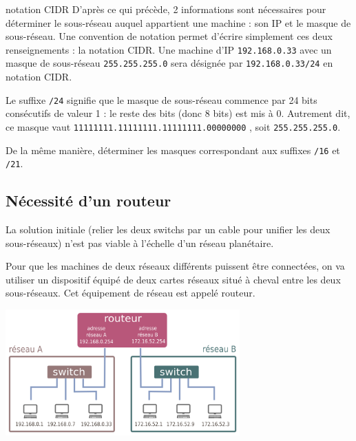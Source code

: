 \documentclass[a4paper,dvipsnames]{article}
\begin{document}
\begin{definition}[breakable]{notation CIDR}{}
  D'après ce qui précède, 2 informations sont nécessaires pour déterminer le sous-réseau auquel appartient une machine : son IP et le masque de sous-réseau. Une convention de notation permet d'écrire simplement ces deux renseignements : la notation CIDR.
  \tcblower
  Une machine d'IP \texttt{192.168.0.33} avec un masque de sous-réseau \texttt{255.255.255.0} sera désignée par \texttt{192.168.0.33/24} en notation CIDR.

  Le suffixe \texttt{/24} signifie que le masque de sous-réseau commence par 24 bits consécutifs de valeur 1 : le reste des bits (donc 8 bits) est mis à 0.
  Autrement dit, ce masque vaut \texttt{11111111.11111111.11111111.00000000} , soit \texttt{255.255.255.0}.
\end{definition}

\medskip

\begin{exercice}[breakable]{}{}
  De la même manière, déterminer les masques correspondant aux suffixes \texttt{/16} et \texttt{/21}.
\end{exercice}

\subsection{Nécessité d'un routeur}

La solution initiale (relier les deux switchs par un cable pour unifier les deux sous-réseaux) n'est pas viable à l'échelle d'un réseau planétaire.

\smallskip

Pour que les machines de deux réseaux différents puissent être connectées, on va utiliser un dispositif équipé de deux cartes réseaux situé à cheval entre les deux sous-réseaux. Cet équipement de réseau est appelé routeur.

\begin{center}
  \includegraphics[width=9cm]{img/routeur.png}
\end{center}
\end{document}
